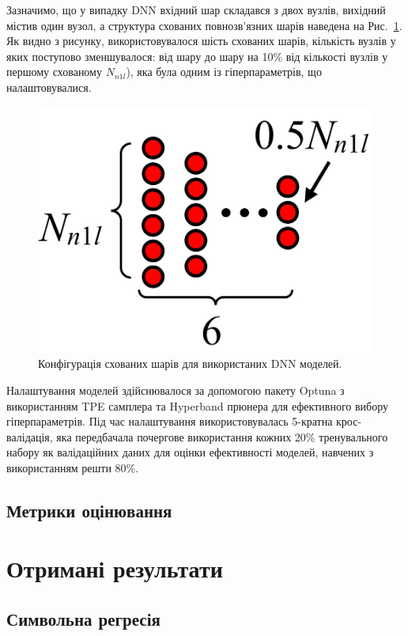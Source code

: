 \documentclass[10pt,a5paper,titlepage,oneside]{book}
\numberwithin{equation}{part}
\begin{document}
Зазначимо, що у випадку DNN вхідний шар складався з двох вузлів, вихідний містив один вузол,
а структура схованих повнозв'язних шарів наведена на Рис.~\ref{figDNN}.
Як видно з рисунку, використовувалося шість схованих шарів, кількість вузлів у яких поступово зменшувалося:
від шару до шару на 10\% від кількості вузлів у першому схованому $N_{n1l}$), яка була одним із гіперпараметрів, що налаштовувалися.


\begin{figure}
	\centering
     \includegraphics[width=0.5\linewidth]{Fig22.png}
	  \caption{Конфігурація схованих шарів для використаних DNN моделей.
}\label{figDNN}
\end{figure}

Налаштування моделей здійснювалося за допомогою пакету Optuna \cite{Akiba2019} з використанням TPE самплера та Hyperband прюнера
для ефективного вибору гіперпараметрів.
Під час налаштування використовувалась 5-кратна крос-валідація, яка передбачала почергове використання кожних 20\% тренувального набору
як валідаційних даних для оцінки ефективності моделей, навчених з використанням решти 80\%.




%
%
%



\section{Метрики оцінювання}

\chapter{Отримані результати}

\section{Символьна регресія}
\end{document}
